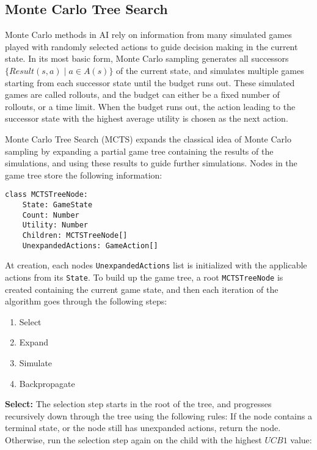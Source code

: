 \subsection{Monte Carlo Tree Search}

Monte Carlo methods in AI rely on information from many simulated games 
played with randomly selected actions to guide decision making in the 
current state. In its most basic form, Monte Carlo sampling generates
all successors $\{ Result(s, a) \;|\; a \in A(s) \}$ of the current
state, and simulates multiple games starting from each successor state
until the budget runs out. These simulated games are called rollouts,
and the budget can either be a fixed number of rollouts, or a time
limit. When the budget runs out, the action leading to the successor
state with the highest average utility is chosen as the next action.



Monte Carlo Tree Search (MCTS) expands the classical idea of Monte Carlo
sampling by expanding a partial game tree containing the results of
the simulations, and using these results to guide further simulations.
Nodes in the game tree store the following information:

\begin{lstlisting}
class MCTSTreeNode:
    State: GameState
    Count: Number
    Utility: Number
    Children: MCTSTreeNode[]
    UnexpandedActions: GameAction[]
\end{lstlisting}

At creation, each nodes \lstinline|UnexpandedActions| list is initialized
with the applicable actions from its \lstinline|State|. To build up the 
game tree, a root \lstinline|MCTSTreeNode| is created containing the 
current game state, and then each iteration of the algorithm goes through 
the following steps:

\begin{enumerate}
    \item Select
    \item Expand
    \item Simulate
    \item Backpropagate
\end{enumerate}

\textbf{Select:} The selection step starts in the root of the tree,
and progresses recursively down through the tree using the following
rules: If the node contains a terminal state, or the node still has
unexpanded actions, return the node. Otherwise, run the selection
step again on the child with the highest $UCB1$ value:

